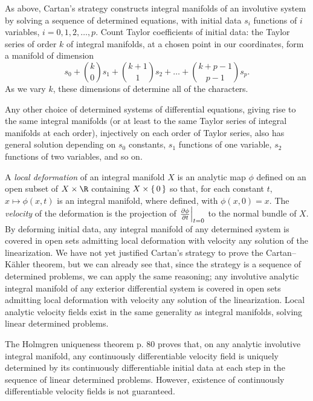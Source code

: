 %
As above, Cartan's strategy constructs integral manifolds of an involutive system by solving a sequence of determined equations, with initial data \(s_i\) functions of \(i\) variables, \(i=0,1,2,\dots,p\).
Count Taylor coefficients of initial data: the Taylor series of order \(k\) of integral manifolds, at a chosen point in our coordinates, form a manifold of dimension
\[
s_0+\binom{k}{0}s_1+\binom{k+1}{1}s_2+\dots+\binom{k+p-1}{p-1}s_p.
\]
As we vary \(k\), these dimensions of determine all of the characters.

Any other choice of determined systems of differential equations, giving rise to the same integral manifolds (or at least to the same Taylor series of integral manifolds at each order), injectively on each order of Taylor series, also has general solution depending on \(s_0\) constants, \(s_1\) functions of one variable, \(s_2\) functions of two variables, and so on.

%
A \emph{local deformation} of an integral manifold \(X\) is an analytic map \(\phi\) defined on an open subset of \(X\times\R\)  containing \(X\times\set{0}\) so that, for each constant \(t\), \(x\mapsto\phi(x,t)\) is an integral manifold, where defined, with \(\phi(x,0)=x\).
The \emph{velocity} of the deformation is the projection of
\(
\left.\pderiv{\phi}{t}\right|_{t=0}
\)
to the normal bundle of \(X\).
By deforming initial data, any integral manifold of any determined system is covered in open sets admitting local deformation with velocity any solution of the linearization.
We have not yet justified Cartan's strategy to prove the Cartan--K\"ahler theorem, but we can already see that, since the strategy is a sequence of determined problems, we can apply the same reasoning;
any involutive analytic integral manifold of any exterior differential system is covered in open sets admitting local deformation with velocity any solution of the linearization.
Local analytic velocity fields exist in the same generality as integral manifolds, solving linear determined problems.

The Holmgren uniqueness theorem \cite{John:1991} p. 80 proves that, on any analytic involutive integral manifold, any continuously differentiable velocity field is uniquely determined by its continuously differentiable initial data at each step in the sequence of linear determined problems.
However, existence of continuously differentiable velocity fields is not guaranteed.

